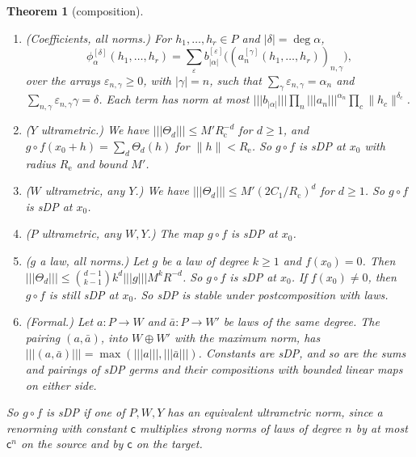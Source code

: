 \documentclass[11pt]{amsart}
\newtheorem{theorem}{Theorem}[section]
\theoremstyle{definition}
\theoremstyle{remark}
\numberwithin{equation}{section}
\newcommand{\abs}[1]{\lvert #1\rvert}
\newcommand{\norm}[1]{\lVert #1\rVert}
\theoremstyle{plain}
\theoremstyle{definition}
\theoremstyle{plain}
\begin{document}
\begin{theorem}[composition]\label{dp:thm:strong-composition}
\leavevmode
\begin{enumerate}
\item \textup{(Coefficients, all norms.)} For $h_1,\dots,h_r\in P$ and $\abs\delta=\deg\alpha$,
\begin{equation}\label{dp:s:eq:composite-coefficient}
 \phi_\alpha^{[\delta]}(h_1,\dots,h_r)=\sum_\varepsilon b_{\abs\alpha}^{[\varepsilon]}\bigl((a_n^{[\gamma]}(h_1,\dots,h_r))_{n,\gamma}\bigr),
\end{equation}
over the arrays $\varepsilon_{n,\gamma}\ge0$, with $\abs\gamma=n$, such that $\sum_\gamma\varepsilon_{n,\gamma}=\alpha_n$ and $\sum_{n,\gamma}\varepsilon_{n,\gamma}\gamma=\delta$. Each term has norm at most $\lvert\!\lvert\!\lvert b_{\abs\alpha}\rvert\!\rvert\!\rvert\prod_n\lvert\!\lvert\!\lvert a_n\rvert\!\rvert\!\rvert^{\alpha_n}\prod_c\norm{h_c}^{\delta_c}$.
\item \textup{($Y$ ultrametric.)} We have $\lvert\!\lvert\!\lvert \Theta_d\rvert\!\rvert\!\rvert\le M'R_{\mathrm c}^{-d}$ for $d\ge1$, and $g\circ f(x_0+h)=\sum_d\Theta_d(h)$ for $\norm h<R_{\mathrm e}$. So $g\circ f$ is sDP at $x_0$ with radius $R_{\mathrm e}$ and bound $M'$.
\item \textup{($W$ ultrametric, any $Y$.)} We have $\lvert\!\lvert\!\lvert \Theta_d\rvert\!\rvert\!\rvert\le M'(2C_1/R_{\mathrm c})^d$ for $d\ge1$. So $g\circ f$ is sDP at $x_0$.
\item \textup{($P$ ultrametric, any $W,Y$.)} The map $g\circ f$ is sDP at $x_0$.
\item \textup{($g$ a law, all norms.)} Let $g$ be a law of degree $k\ge1$ and $f(x_0)=0$. Then $\lvert\!\lvert\!\lvert \Theta_d\rvert\!\rvert\!\rvert\le\binom{d-1}{k-1}k^d\lvert\!\lvert\!\lvert g\rvert\!\rvert\!\rvert M^kR^{-d}$. So $g\circ f$ is sDP at $x_0$. If $f(x_0)\ne0$, then $g\circ f$ is still sDP at $x_0$. So sDP is stable under postcomposition with laws.
\item \textup{(Formal.)} Let $a\colon P\to W$ and $\bar a\colon P\to W'$ be laws of the same degree. The pairing $(a,\bar a)$, into $W\oplus W'$ with the maximum norm, has $\lvert\!\lvert\!\lvert (a,\bar a)\rvert\!\rvert\!\rvert=\max(\lvert\!\lvert\!\lvert a\rvert\!\rvert\!\rvert,\lvert\!\lvert\!\lvert \bar a\rvert\!\rvert\!\rvert)$. Constants are sDP, and so are the sums and pairings of sDP germs and their compositions with bounded linear maps on either side.
\end{enumerate}
So $g\circ f$ is sDP if one of $P,W,Y$ has an equivalent ultrametric norm, since a renorming with constant $\mathsf c$ multiplies strong norms of laws of degree $n$ by at most $\mathsf c^n$ on the source and by $\mathsf c$ on the target.
\end{theorem}
\end{document}
